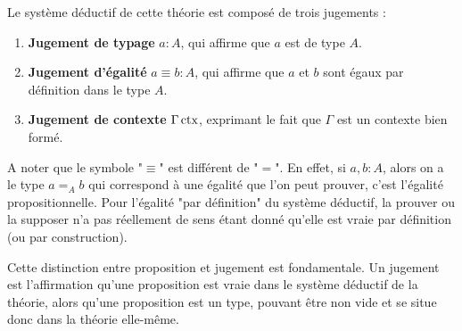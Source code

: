 \documentclass[../../rapport.tex]{subfiles}
\begin{document}
  Le système déductif de cette théorie est composé de trois jugements :
  \begin{enumerate}
    \item \textbf{Jugement de typage} $a : A$, qui affirme que $a$ est de type $A$.
    \item \textbf{Jugement d'égalité} $a \equiv b : A$, qui affirme que $a$ et $b$ sont égaux par définition dans le type $A$.
    \item \textbf{Jugement de contexte} $\Gamma \operatorname{ctx}$, exprimant le fait que $\Gamma$ est un contexte bien formé.
  \end{enumerate}
  A noter que le symbole "$\equiv$" est différent de "$=$".
  En effet, si $a, b : A$, alors on a le type $a =_A b$ qui correspond à une égalité
  que l'on peut prouver, c'est l'égalité propositionnelle.
  Pour l'égalité "par définition" du système déductif, la prouver ou la supposer n'a pas réellement de sens
  étant donné qu'elle est vraie par définition (ou par construction).

  Cette distinction entre proposition et jugement est fondamentale.
  Un jugement est l'affirmation qu'une proposition est vraie dans le système déductif de la théorie,
  alors qu'une proposition est un type, pouvant être non vide et se situe donc dans la théorie elle-même.
\end{document}
